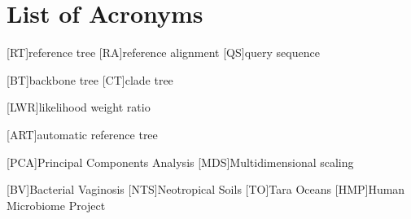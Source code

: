 \documentclass{wissdoc}
\author{\myname}
\title{\mytitle}
\begin{document}
\frontmatter
{}


\blankpage


\blankpage


\blankpage


\blankpage


{\parskip 0pt\tableofcontents}
\blankpage

{\parskip 0pt\listoffigures}
\blankpage

{\parskip 0pt\listoftables}
\blankpage


\chapter*{List of Acronyms}
\begin{acronym}
    [RT]{reference tree}
    [RA]{reference alignment}
    [QS]{query sequence}

    [BT]{backbone tree}
    [CT]{clade tree}

    [LWR]{likelihood weight ratio}

    [ART]{automatic reference tree}

    [PCA]{Principal Components Analysis}
    [MDS]{Multidimensional scaling}

    [BV]{Bacterial Vaginosis}
    [NTS]{Neotropical Soils}
    [TO]{Tara Oceans}
    [HMP]{Human Microbiome Project}
\end{acronym}
\blankpage


\mainmatter
{}







\end{document}
